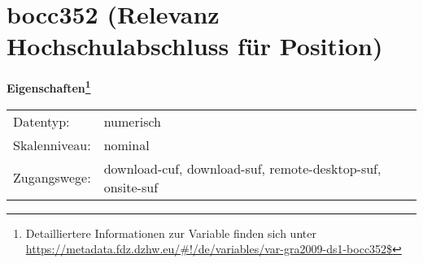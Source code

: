 
    \setcounter{footnote}{0}

    \vspace*{-1.8cm}
	\section{bocc352 (Relevanz Hochschulabschluss für Position)}
	\label{section:bocc352}



    \vspace*{0.5cm}
    \noindent\textbf{Eigenschaften\footnote{Detailliertere Informationen zur Variable finden sich unter
		\url{https://metadata.fdz.dzhw.eu/\#!/de/variables/var-gra2009-ds1-bocc352$}}}\\
	\begin{tabularx}{\hsize}{@{}lX}
	Datentyp: & numerisch \\
	Skalenniveau: & nominal \\
	Zugangswege: &
	  download-cuf, 
	  download-suf, 
	  remote-desktop-suf, 
	  onsite-suf
 \\
    \end{tabularx}



